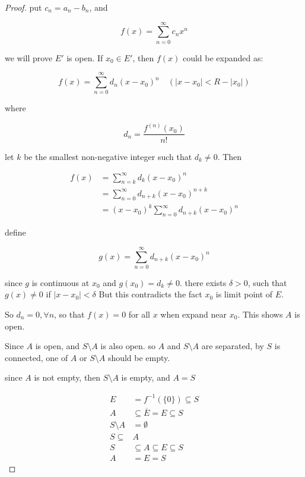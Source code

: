 \begin{proof}
    put $c_n = a_n - b_n$, and


    \[
        f(x) = \sum_{n=0}^{\infty}c_n x^n
    \]

    we will prove $E'$ is open. If $x_0 \in E'$, then $f(x)$ could be expanded as:

    \[
        f(x) = \sum_{n=0}^{\infty}d_n (x-x_0)^n \quad (|x-x_0| < R - |x_0|)
    \]

    where 

    \[
        d_n = \frac{f^{(n)}(x_0)}{n!}
    \]

    let $k$ be the smallest non-negative integer such that $d_k \ne 0$. Then

    \begin{align*}
        f(x) &= \sum_{n=k}^{\infty}d_k (x-x_0)^n  \\
        &= \sum_{n=0}^{\infty}d_{n+k}(x-x_0)^{n+k} \\
        &= (x-x_0)^k \sum_{n=0}^{\infty}d_{n+k}(x-x_0)^n
    \end{align*}

    define

    \[
        g(x) = \sum_{n=0}^{\infty}d_{n+k}(x-x_0)^n
    \]

    since $g$ is continuous at $x_0$ and $g(x_0) = d_k \ne 0$. 
    there exists $\delta > 0$, such that $g(x) \ne 0$ if $|x-x_0| < \delta$ 
    But this contradicts the fact $x_0$ is limit point of $E$.

    So $d_n = 0, \forall n$, so that $f(x) = 0$ for all $x$ when expand near $x_0$.
    This shows $A$ is open. 

    Since $A$ is open, and $S \setminus A$ is also open. so $A$ and $S \setminus A$ are separated,
    by $S$ is connected, one of $A$ or $S \setminus A$ should be empty.

    since $A$ is not empty, then $S \setminus A$ is empty, and $A = S$

    \begin{align*}
        E &= f^{-1}(\{ 0 \}) \subseteq S \\
        A &\subseteq \overline{E} = E \subseteq S \\
        S \setminus A &= \emptyset \\
        S \subseteq & A \\
        S & \subseteq A  \subseteq E  \subseteq S \\
        A &= E  = S
    \end{align*}
\end{proof}

